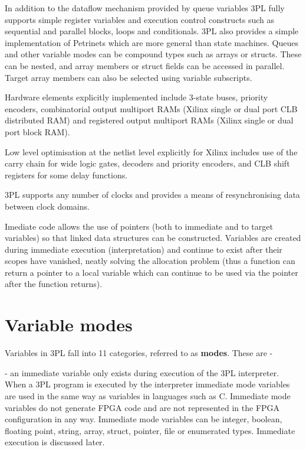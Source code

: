     In addition to the dataflow mechanism provided by queue variables 3PL
    fully supports simple register variables and execution control
    constructs such as sequential and parallel blocks, loops and
    conditionals. 3PL also provides a simple implementation of Petrinets which
    are more general than state machines. Queues and other variable modes can
    be compound types such as arrays or structs. These can be nested, and
    array members or struct fields can be accessed in parallel. Target array
    members can also be selected using variable subscripts.

    Hardware elements explicitly implemented include 3-state buses,
    priority encoders, combinatorial output multiport RAMs (Xilinx single
    or dual port CLB distributed RAM) and registered output multiport
    RAMs (Xilinx single or dual port block RAM).

    Low level optimisation at the netlist level explicitly for Xilinx
    includes use of the carry chain for wide logic gates, decoders and
    priority encoders, and CLB shift registers for some delay functions.

    3PL supports any number of clocks and provides a means of
    resynchronising data between clock domains.

    Imediate code allows the use of pointers (both to immediate and
    to target variables) so that linked data structures can be
    constructed. Variables are created during immediate execution
    (interpretation) and continue to exist after their scopes have
    vanished, neatly solving the allocation problem (thus a function can
    return a pointer to a local variable which can continue to be used
    via the pointer after the function returns).


    
    

    \section{Variable modes}

        Variables in 3PL fall into 11 categories, referred to as {\bf modes}. These are -

         - an immediate variable only exists during execution of the 3PL interpreter.
        When a 3PL program is executed by the interpreter immediate mode variables are
        used in the same way as variables in languages such as C. Immediate mode variables
        do not generate FPGA code and are not represented in the FPGA configuration in any way.
        Immediate mode variables can be integer, boolean, floating point, string, array,
        struct, pointer, file or enumerated types. Immediate execution is discussed later.

